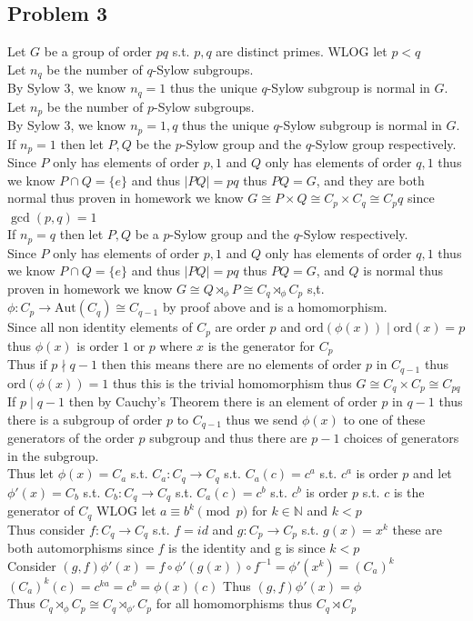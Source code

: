 \documentclass[12pt,letterpaper]{article}
\theoremstyle{definition}
\newcommand{\N}{\mathbb{N}}
\renewcommand{\t}[1]{\text{#1}}
\begin{document}
\subsection*{Problem 3}
Let $G$ be a group of order $pq$ s.t. $p,q$ are distinct primes. WLOG let $p<q$\\
Let $n_q$ be the number of $q$-Sylow subgroups.\\
By Sylow 3, we know $n_q=1$ thus the unique $q$-Sylow subgroup is normal in $G$.
Let $n_p$ be the number of $p$-Sylow subgroups.\\
By Sylow 3, we know $n_p=1,q$ thus the unique $q$-Sylow subgroup is normal in $G$.\\
If $n_p=1$ then let $P,Q$ be the $p$-Sylow group and the $q$-Sylow group respectively.\\
Since $P$ only has elements of order $p,1$ and $Q$ only has elements of order $q,1$ thus we know $P\cap Q = \{e\}$ and thus $|PQ|=pq$ thus $PQ=G$, and they are both normal thus proven in homework we know
$G \cong P \times Q \cong C_p \times C_q \cong C_pq$ since $\gcd(p,q)=1$\\
If $n_p=q$ then let $P,Q$ be a $p$-Sylow group and the $q$-Sylow respectively.\\
Since $P$ only has elements of order $p,1$ and $Q$ only has elements of order $q,1$ thus we know $P\cap Q = \{e\}$ and thus $|PQ|=pq$ thus $PQ=G$, and $Q$ is normal thus proven in homework we know
$G \cong Q \rtimes_\phi P \cong C_q \rtimes_\phi C_p$ s,t. $\phi: C_p \rightarrow \t{Aut}(C_q) \cong C_{q-1}$ by proof above and is a homomorphism.\\
Since all non identity elements of $C_p$ are order $p$ and ord$(\phi(x)) \mid \t{ord}(x)=p$ thus $\phi(x)$ is order $1$ or $p$ where $x$ is the generator for $C_p$\\
Thus if $p \nmid q-1$ then this means there are no elements of order $p$ in $C_{q-1}$ thus ord$(\phi(x))=1$ thus this is the trivial homomorphism thus $G \cong C_q \times C_p \cong C_{pq}$\\
If $p \mid q-1$ then by Cauchy's Theorem there is an element of order $p$ in $q-1$ thus there is a subgroup of order $p$ to $C_{q-1}$ thus we send $\phi(x)$ to one of these generators of the order $p$ subgroup and thus there are $p-1$ choices of generators in the subgroup.\\
Thus let $\phi(x)=C_a$ s.t. $C_a : C_q \rightarrow C_q$ s.t. $C_a(c)=c^a$ s.t. $c^a$ is order $p$ and let $\phi'(x)=C_b$ s.t. $C_b : C_q \rightarrow C_q$ s.t. $C_a(c)=c^b$ s.t. $c^b$ is order $p$ s.t. $c$ is the generator of $C_q$ WLOG let $a \equiv b^k \pmod{p}$ for $k \in \N$ and $k < p$\\
Thus consider $f: C_q \rightarrow C_q$ s.t. $f=id$ and $g : C_p \rightarrow C_p$ s.t. $g(x)=x^k$ these are both automorphisms since $f$ is the identity and g is since $k < p$\\
Consider $(g,f)\phi'(x)=f \circ \phi'(g(x))\circ f^{-1}= \phi'(x^k)=(C_a)^k$\\
$(C_a)^k(c)=c^{ka}=c^b=\phi(x)(c)$
Thus $(g,f)\phi'(x)=\phi$\\
Thus $C_q \rtimes_\phi C_p \cong C_q \rtimes_{\phi'} C_p$ for all homomorphisms thus $C_q \rtimes C_p$
\end{document}
